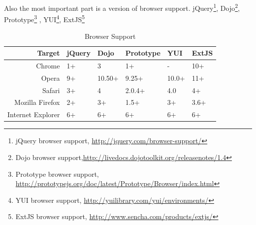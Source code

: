 	Also the most important part is a version of browser support. jQuery\footnote{jQuery browser support, \url{http://jquery.com/browser-support/}}, Dojo\footnote{Dojo browser support,\url{http://livedocs.dojotoolkit.org/releasenotes/1.4}}, Prototype\footnote{Prototype browser support, \url{http://prototypejs.org/doc/latest/Prototype/Browser/index.html}} , YUI\footnote{YUI browser support, \url{http://yuilibrary.com/yui/environments/}}, ExtJS\footnote{ExtJS browser support, \url{http://www.sencha.com/products/extjs/}}

	\begin{table}[H]
	\centering
	\begin{tabular}{|r|l|l|l|l|l|}
	\hline
	Target 			& jQuery & Dojo & Prototype & YUI & ExtJS \\
	\hline
	\hline
	Chrome		& 1+ & 3 & 1+ & - & 10+ \\
	\hline
	Opera		& 9+ & 10.50+ & 9.25+ & 10.0+ & 11+ \\
	\hline
	Safari		& 3+ & 4 & 2.0.4+ & 4.0 & 4+ \\
	\hline
	Mozilla Firefox		& 2+ & 3+ & 1.5+ & 3+ & 3.6+ \\
	\hline
	Internet Explorer		& 6+ & 6+ & 6+ & 6+ & 6+ \\
	\hline
	\end{tabular}
	\caption[Caption in TOC]{Browser Support}
	\label{tab:internal_results}
	\end{table}


